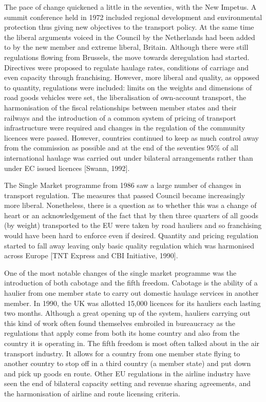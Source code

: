 The pace of change quickened a little in the seventies, with the New Impetus. A summit conference held in 1972 included regional development and environmental protection thus giving new objectives to the transport policy. At the same time the liberal arguments voiced in the Council by the Netherlands had been added to by the new member and extreme liberal, Britain. Although there were still regulations flowing from Brussels, the move towards deregulation had started. Directives were proposed to regulate haulage rates, conditions of carriage and even capacity through franchising. However, more liberal and quality, as opposed to quantity, regulations were included: limits on the weights and dimensions of road goods vehicles were set, the liberalisation of own-account transport, the harmonisation of the fiscal relationships between member states and their railways and the introduction of a common system of pricing of transport infrastructure were required and changes in the regulation of the community licences were passed. However, countries continued to keep as much control away from the commission as possible and at the end of the seventies 95\% of all international haulage was carried out under bilateral arrangements rather than under EC issued licences [Swann, 1992].

The Single Market programme from 1986 saw a large number of changes in transport regulation. The measures that passed Council became increasingly more liberal. Nonetheless, there is a question as to whether this was a change of heart or an acknowledgement of the fact that by then three quarters of all goods (by weight) transported to the EU were taken by road hauliers and so franchising would have been hard to enforce even if desired. Quantity and pricing regulation started to fall away leaving only basic quality regulation which was harmonised across Europe [TNT Express and CBI Initiative, 1990].

One of the most notable changes of the single market programme was the introduction of both cabotage and the fifth freedom. Cabotage is the ability of a haulier from one member state to carry out domestic haulage services in another member. In 1990, the UK was allotted 15,000 licences for its hauliers each lasting two months. Although a great opening up of the system, hauliers carrying out this kind of work often found themselves embroiled in bureaucracy as the regulations that apply come from both its home country and also from the country it is operating in. The fifth freedom is most often talked about in the air transport industry. It allows for a country from one member state flying to another country to stop off in a third country (a member state) and put down and pick up goods en route. Other EU regulations in the airline industry have seen the end of bilateral capacity setting and revenue sharing agreements, and the harmonisation of airline and route licensing criteria.

